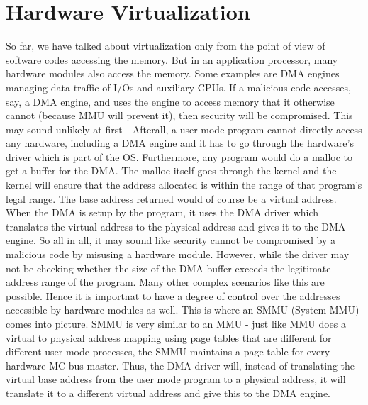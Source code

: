 \section{Hardware Virtualization}
So far, we have talked about virtualization only from the point of view of software codes accessing the memory. But in an application processor, many hardware modules also access the memory. Some examples are DMA engines managing data traffic of I/Os and auxiliary CPUs. If a malicious code accesses, say, a DMA engine, and uses the engine to access memory that it otherwise cannot (because MMU will prevent it), then security will be compromised. This may sound unlikely at first - Afterall, a user mode program cannot directly access any hardware, including a DMA engine and it has to go through the hardware's driver which is part of the OS. Furthermore, any program would do a malloc to get a buffer for the DMA. The malloc itself goes through the kernel and the kernel will ensure that the address allocated is within the range of that program's legal range. The base address returned would of course be a virtual address. When the DMA is setup by the program, it uses the DMA driver which translates the virtual address to the physical address and gives it to the DMA engine. So all in all, it may sound like security cannot be compromised by a malicious code by misusing a hardware module. However, while the driver may not be checking whether the size of the DMA buffer exceeds the legitimate address range of the program. Many other complex scenarios like this are possible. Hence it is importnat to have a degree of control over the addresses accessible by hardware modules as well. This is where an SMMU (System MMU) comes into picture. SMMU is very similar to an MMU - just like MMU does a virtual to physical address mapping using page tables that are different for different user mode processes, the SMMU maintains a page table for every hardware MC bus master. Thus, the DMA driver will, instead of translating the virtual base address from the user mode program to a physical address, it will translate it to a different virtual address and give this to the DMA engine. 

